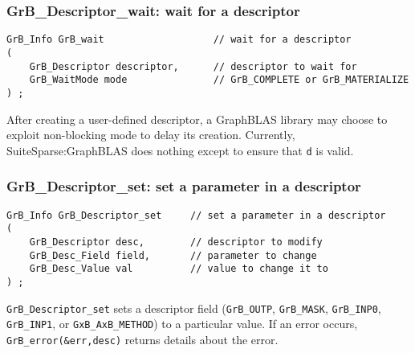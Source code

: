 \documentclass[12pt]{article}
\begin{document}
\subsubsection{{\sf GrB\_Descriptor\_wait:} wait for a descriptor}
\label{descriptor_wait}

\begin{mdframed}[userdefinedwidth=6in]
{\footnotesize
\begin{verbatim}
GrB_Info GrB_wait                   // wait for a descriptor
(
    GrB_Descriptor descriptor,      // descriptor to wait for
    GrB_WaitMode mode               // GrB_COMPLETE or GrB_MATERIALIZE
) ;
\end{verbatim}
}\end{mdframed}

After creating a user-defined descriptor, a GraphBLAS library may choose to
exploit non-blocking mode to delay its creation.  Currently,
SuiteSparse:GraphBLAS does nothing except to ensure that \verb'd' is valid.

\newpage
\subsubsection{{\sf GrB\_Descriptor\_set:}  set a parameter in a descriptor}
\label{descriptor_set}

\begin{mdframed}[userdefinedwidth=6in]
{\footnotesize
\begin{verbatim}
GrB_Info GrB_Descriptor_set     // set a parameter in a descriptor
(
    GrB_Descriptor desc,        // descriptor to modify
    GrB_Desc_Field field,       // parameter to change
    GrB_Desc_Value val          // value to change it to
) ;
\end{verbatim} } \end{mdframed}

\verb'GrB_Descriptor_set' sets a descriptor field (\verb'GrB_OUTP',
\verb'GrB_MASK', \verb'GrB_INP0', \verb'GrB_INP1', or \verb'GxB_AxB_METHOD') to
a particular value.
If an error occurs, \verb'GrB_error(&err,desc)' returns details about the error.
\end{document}
